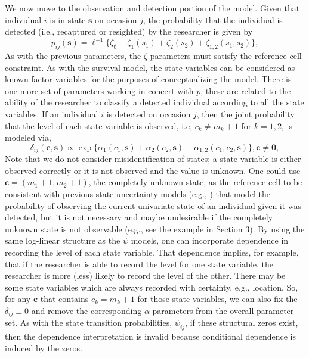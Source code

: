\documentclass[fleqn]{article}
\newcommand{\bs}{\ensuremath{\mathbf{s}}}
\newcommand{\bc}{\ensuremath{\mathbf{c}}}
\newcommand{\bzero}{\ensuremath{\mathbf{0}}}
\begin{document}
We now move to the observation and detection portion of the model. Given that individual $i$ is in state $\bs$ on occasion $j$, the probability that the individual is detected (i.e., recaptured or resighted) by the researcher is given by
\begin{equation}
p_{ij}(\bs) = \ell^{-1}\{\zeta_\emptyset + \zeta_1(s_1) + \zeta_2(s_2) + \zeta_{1,2}(s_1,s_2)\},
\end{equation}
As with the previous parameters, the $\zeta$ parameters must satisfy the reference cell constraint. As with the survival model, the state variables can be considered as known factor variables for the purposes of conceptualizing the model. There is one more set of parameters working in concert with $p$, these are related to the ability of the researcher to classify a detected individual according to all the state variables. If an individual $i$ is detected on occasion $j$, then the joint probability that the level of each state variable is observed, i.e, $c_k \ne m_k+1$ for $k=1,2$, is modeled via,
\begin{equation}
\delta_{ij}(\bc,\bs) \propto \exp\{\alpha_1(c_1,\bs) + \alpha_2(c_2,\bs) + \alpha_{1,2}(c_1,c_2,\bs)\}, \bc \ne \bzero,
\end{equation}
Note that we do not consider misidentification of states; a state variable is either observed correctly or it is not observed and the value is unknown. One could use $\bc = (m_1+1,m_2+1)$, the completely unknown state, as the reference cell to be consistent with previous state uncertainty models (e.g., \citealt{Laake:2013ab,kendall2012estimating}) that model the probability of observing the current univariate state of an individual given it was detected, but it is not necessary and maybe undesirable if the completely unknown state is not observable (e.g., see the example in Section 3). By using the same log-linear structure as the $\psi$ models, one can incorporate dependence in recording the level of each state variable. That dependence implies, for example, that if the researcher is able to record the level for one state variable, the researcher is more (less) likely to record the level of the other. There may be some state variables which are always recorded with certainty, e.g., location. So, for any $\bc$ that contains $c_k=m_k+1$ for those state variables, we can also fix the $\delta_{ij}\equiv 0$ and remove the corresponding $\alpha$ parameters from the overall parameter set. As with the state transition probabilities, $\psi_{ij}$, if these structural zeros exist, then the dependence interpretation is invalid because conditional dependence is induced by the zeros. 
\end{document}
